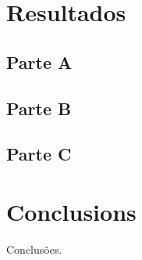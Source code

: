 \documentclass{report}
\begin{document}
\chapter{Resultados}

\section{Parte A}

\section{Parte B}

\section{Parte C}

\chapter{Conclusions}
Conclusões.
\end{document}
